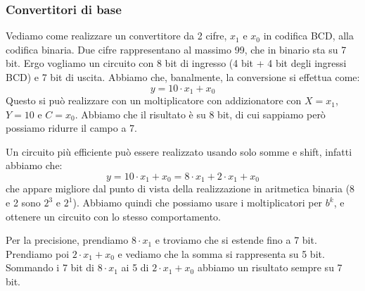 \documentclass[a4paper,11pt]{article}
\begin{document}
\subsubsection{Convertitori di base}
Vediamo come realizzare un convertitore da 2 cifre, $x_1$ e $x_0$ in codifica BCD, alla codifica binaria.
Due cifre rappresentano al massimo 99, che in binario sta su 7 bit.
Ergo vogliamo un circuito con 8 bit di ingresso (4 bit + 4 bit degli ingressi BCD) e 7 bit di uscita.
Abbiamo che, banalmente, la conversione si effettua come:
$$
y = 10 \cdot x_1 + x_0 
$$
Questo si può realizzare con un moltiplicatore con addizionatore con $X=x_1$, $Y=10$ e $C=x_0$.
Abbiamo che il risultato è su 8 bit, di cui sappiamo però possiamo ridurre il campo a 7.
\par\smallskip 
Un circuito più efficiente può essere realizzato usando solo somme e shift, infatti abbiamo che:
$$ y = 10 \cdot x_1 + x_ 0 = 8 \cdot x_1 + 2 \cdot x_1 + x_0 $$
che appare migliore dal punto di vista della realizzazione in aritmetica binaria (8 e 2 sono $2^3$ e $2^1$).
Abbiamo quindi che possiamo usare i moltiplicatori per $b^k$, e ottenere un circuito con lo stesso comportamento.

Per la precisione, prendiamo $8 \cdot x_1$ e troviamo che si estende fino a 7 bit.
Prendiamo poi  $2 \cdot x_1 + x_0$ e vediamo che la somma si rappresenta su 5 bit.
Sommando i 7 bit di $8 \cdot x_1$ ai 5 di $2 \cdot x_1 + x_0$ abbiamo un risultato sempre su 7 bit.
\end{document}
